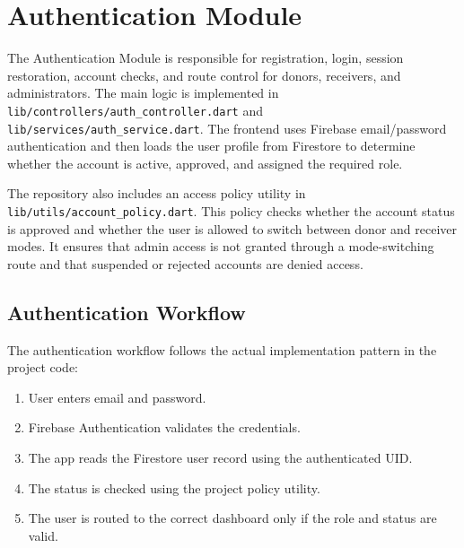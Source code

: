 
\section{Authentication Module}

The Authentication Module is responsible for registration, login, session restoration, account checks, and route control for donors, receivers, and administrators. The main logic is implemented in \texttt{lib/controllers/auth_controller.dart} and \texttt{lib/services/auth_service.dart}. The frontend uses Firebase email/password authentication and then loads the user profile from Firestore to determine whether the account is active, approved, and assigned the required role.

The repository also includes an access policy utility in \texttt{lib/utils/account_policy.dart}. This policy checks whether the account status is approved and whether the user is allowed to switch between donor and receiver modes. It ensures that admin access is not granted through a mode-switching route and that suspended or rejected accounts are denied access.

\subsection{Authentication Workflow}

The authentication workflow follows the actual implementation pattern in the project code:

\begin{enumerate}
    \item User enters email and password.
    \item Firebase Authentication validates the credentials.
    \item The app reads the Firestore user record using the authenticated UID.
    \item The status is checked using the project policy utility.
    \item The user is routed to the correct dashboard only if the role and status are valid.
\end{enumerate}

